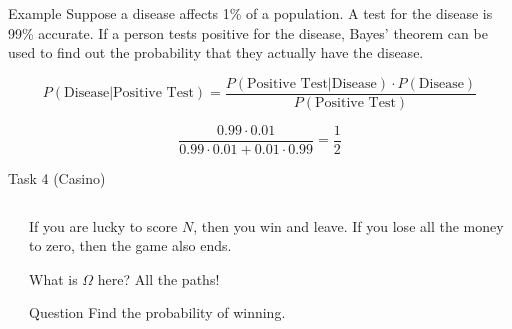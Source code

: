 \documentclass[fullscreen=true, bookmarks=true, hyperref={pdfencoding=unicode}]{beamer}
\begin{document}
\begin{frame}
  \begin{block}{Example}
    Suppose a disease affects 1\% of a population. A test for the disease is 99\% accurate. If a person tests positive for the disease, Bayes' theorem can be used to find out the probability that they actually have the disease.
    
    \pause
    \[
    P(\text{{Disease}} | \text{{Positive Test}}) = \frac{P(\text{{Positive Test}} | \text{{Disease}}) \cdot P(\text{{Disease}})}{P(\text{{Positive Test}})}
    \]

    \pause
    \[
    \frac{0.99 \cdot 0.01}{0.99 \cdot 0.01 + 0.01 \cdot 0.99} = \frac{1}{2}
    \]
  \end{block}
\end{frame}


\begin{frame}{Task 4 (Casino)}
  
  \begin{columns}
    \begin{column}{0.5\textwidth}
    \end{column}
    \begin{column}{0.5\textwidth}
      If you are lucky to score $N$, then you win and leave. 
      If you lose all the money to zero, then the game also ends.

      \pause
      What is $\Omega$ here?
      \pause
      All the paths!

      \pause
      \begin{block}{Question}
        Find the probability of winning.
      \end{block}
    \end{column}
  \end{columns}  
\end{frame}
\end{document}

